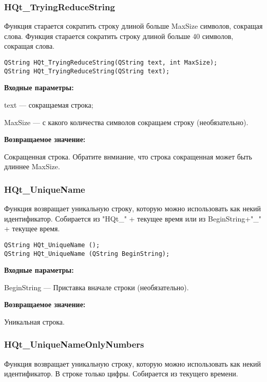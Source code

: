 \documentclass[a4paper,12pt]{article}
\begin{document}
\subsubsection{HQt\_TryingReduceString}\label{HQt_TryingReduceString}

Функция старается сократить строку длиной больше MaxSize символов, сокращая слова. Функция старается сократить строку длиной больше 40 символов, сокращая слова.


\begin{lstlisting}[label=code_syntax_HQt_TryingReduceString,caption=Синтаксис]
QString HQt_TryingReduceString(QString text, int MaxSize);
QString HQt_TryingReduceString(QString text);
\end{lstlisting}

\textbf{Входные параметры:}

text --- сокращаемая строка;
 
	MaxSize --- с какого количества символов сокращаем строку (необязательно).

\textbf{Возвращаемое значение:}

Сокращенная строка. Обратите внмиание, что строка сокращенная может быть длиннее MaxSize.


\subsubsection{HQt\_UniqueName}\label{HQt_UniqueName}

Функция возвращает уникальную строку, которую можно использовать как некий идентификатор. Собирается из "HQt\_" + текущее время или из BeginString+"\_" + текущее время.


\begin{lstlisting}[label=code_syntax_HQt_UniqueName,caption=Синтаксис]
QString HQt_UniqueName ();
QString HQt_UniqueName (QString BeginString);
\end{lstlisting}

\textbf{Входные параметры:}

BeginString --- Приставка вначале строки (необязательно).

\textbf{Возвращаемое значение:}

Уникальная строка.


\subsubsection{HQt\_UniqueNameOnlyNumbers}\label{HQt_UniqueNameOnlyNumbers}

Функция возвращает уникальную строку, которую можно использовать как некий идентификатор. В строке только цифры. Собирается из текущего времени.
\end{document}

